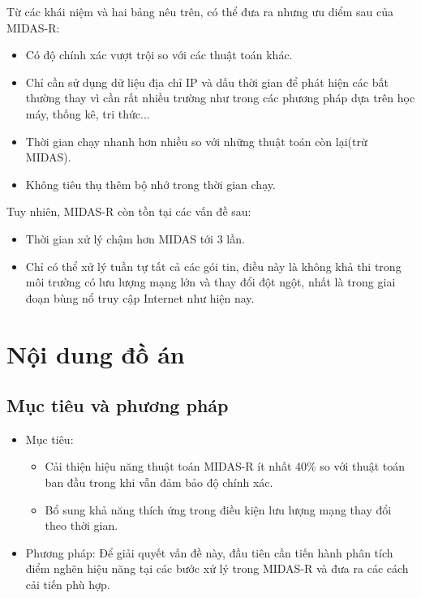 Từ các khái niệm và hai bảng nêu trên, có thể đưa ra nhưng ưu diểm sau của MIDAS-R:
\begin{itemize}
    \item Có độ chính xác vượt trội so với các thuật toán khác.
    \item Chỉ cần sử dụng dữ liệu địa chỉ IP và dấu thời gian để phát hiện các bất thường
          thay vì cần rất nhiều trường như trong các phương pháp dựa trên học máy, thống kê, tri thức...
    \item Thời gian chạy nhanh hơn nhiều so với những thuật toán còn lại(trừ MIDAS).
    \item Không tiêu thụ thêm bộ nhớ trong thời gian chạy.
\end{itemize}

Tuy nhiên, MIDAS-R còn tồn tại các vấn đề sau:
\begin{itemize}
    \item Thời gian xử lý chậm hơn MIDAS tới 3 lần.
    \item Chỉ có thể xử lý tuần tự tất cả các gói tin, điều này là không
          khả thi trong môi trường có lưu lượng mạng lớn và thay đổi đột ngột,
          nhất là trong giai đoạn bùng nổ truy cập Internet như hiện nay.
\end{itemize}


\section{Nội dung đồ án}

\subsection{Mục tiêu và phương pháp}
\begin{itemize}
    \item Mục tiêu:
          \begin{itemize}
              \item Cải thiện hiệu năng thuật toán MIDAS-R
                    ít nhất 40\% so với thuật toán ban đầu trong khi vẫn đảm bảo độ chính xác.
              \item Bổ sung khả năng thích ứng trong điều kiện
                    lưu lượng mạng thay đổi theo thời gian.
          \end{itemize}

    \item Phương pháp: Để giải quyết vấn đề này,
          đầu tiên cần tiến hành phân tích điểm nghẽn hiệu năng tại các bước xử lý trong MIDAS-R và
          đưa ra các cách cải tiến phù hợp.
\end{itemize}


